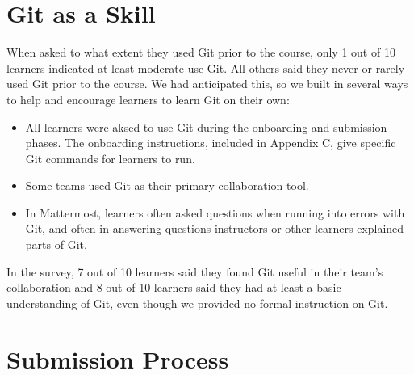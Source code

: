 \documentclass[12pt,twoside]{mitthesis}
\newcommand{\review}[1]{{\color{mygreen} #1}}
\begin{document}
\section{Git as a Skill}

\review{When asked to what extent they used Git prior to the course, only 1 out of 10 learners indicated at least moderate use Git. All others said they never or rarely used Git prior to the course. We had anticipated this, so we built in several ways to help and encourage learners to learn Git on their own:
\begin{itemize}
\item All learners were aksed to use Git during the onboarding and submission phases. The onboarding instructions, included in Appendix C, give specific Git commands for learners to run.
\item Some teams used Git as their primary collaboration tool.
\item In Mattermost, learners often asked questions when running into errors with Git, and often in answering questions instructors or other learners explained parts of Git.
\end{itemize}
In the survey, 7 out of 10 learners said they found Git useful in their team's collaboration and 8 out of 10 learners said they had at least a basic understanding of Git, even though we provided no formal instruction on Git.}

\section{Submission Process}
\end{document}
